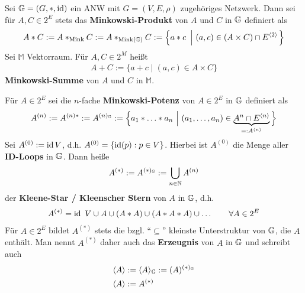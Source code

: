 \begin{proposition}\enter
    Sei $\mathbb{G}=(G,\ast,\operatorname{id})$ ein ANW mit $G=(V,E,\rho)$ zugehöriges Netzwerk. 
    Dann sei für $A,C\in 2^E$ stets das \textbf{Minkowski-Produkt} von $A$ und $C$ in $\mathbb{G}$ definiert als
    \begin{align*}
        A\ast C
        :=A\ast_{\text{Mink}} C
        :=A\ast_{\text{Mink}(\mathbb{G})} C
        :=\left\lbrace a\ast c~\left|~(a,c)\in (A\times C)\cap E^{\langle2\rangle}\right.\right\rbrace
    \end{align*}
    Sei $\mathbb{M}$ Vektorraum. Für $A,C\in 2^M$ heißt
    \begin{align*}
        A+C:=\big\lbrace a+c\mid (a,c)\in A\times C\big\rbrace
    \end{align*}
    \textbf{Minkowski-Summe} von $A$ und $C$ in $\mathbb{M}$.

    Für $A\in 2^E$ sei die $n$-fache \textbf{Minkowski-Potenz} von $A\in 2^E$ in $\mathbb{G}$ definiert als
    \begin{align*}
        A^{(n)}
        := A^{(n)\ast}
        := A^{(n)_{\mathbb{G}}}
        :=\Big\lbrace a_1\ast\ldots\ast a_n~\Big|~(a_1,\ldots,a_n)\in \underbrace{A^n\cap E^{\langle n\rangle}}_{=:A^{\langle n\rangle}}\Big\rbrace
    \end{align*}
    Sei $A^{(0)}:=\operatorname{id} V$, d.h. $A^{(0)}=\lbrace\operatorname{id}(p):p\in V\rbrace$. Hierbei ist $A^{(0)}$ die Menge aller \textbf{ID-Loops} in $\mathbb{G}$.
    Dann heiße
    \begin{align*}
        A^{(\ast)}:=A^{(\ast)_{\mathbb{G}}}:=\bigcup\limits_{n\in\mathbb{N}} A^{(n)}
    \end{align*}
    der \textbf{Kleene-Star / Kleenscher Stern} von $A$ in $\mathbb{G}$, d.h.
    \begin{align*}
        A^{(\ast)}=\operatorname{id}~V\cup A\cup (A\ast A)\cup (A\ast A\ast A)\cup\ldots\qquad\forall A\in 2^E
    \end{align*}
    Für $A\in 2^E$ bildet $A^{(\ast)}$ stets die bzgl. ``$\subseteq$'' kleinste Unterstruktur von $\mathbb{G}$, die $A$ enthält. Man nennt $A^{(\ast)}$ daher auch das \textbf{Erzeugnis} von $A$ in $\mathbb{G}$ und schreibt auch
    \begin{align*}
        \langle A\rangle &:=\langle A\rangle_{\mathbb{G}}:=(A)^{(\ast)_{\mathbb{G}}}\\
        \langle A\rangle&:=A^{(\ast)}
    \end{align*}
\end{proposition}

